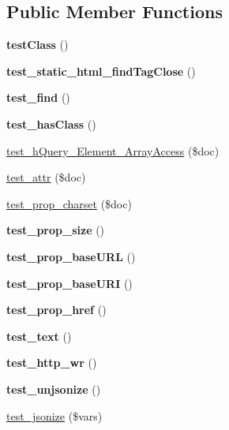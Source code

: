 \subsection*{Public Member Functions}
\begin{DoxyCompactItemize}
\item 
\mbox{\label{classTestHQuery_ab443ea2d5780f2bdef84e52f884a325f}} 
{\bfseries test\+Class} ()
\item 
\mbox{\label{classTestHQuery_ac4b8800d86255709f722f00c8e419f02}} 
{\bfseries test\+\_\+static\+\_\+html\+\_\+find\+Tag\+Close} ()
\item 
\mbox{\label{classTestHQuery_aeeb2c6cd80e096a6d97e9ae42dee8210}} 
{\bfseries test\+\_\+find} ()
\item 
\mbox{\label{classTestHQuery_a59492acce4bbe226ac84759196a10d52}} 
{\bfseries test\+\_\+has\+Class} ()
\item 
\mbox{\hyperlink{classTestHQuery_a54c617e0c89afdbe81d7a8cbb64eb20d}{test\+\_\+h\+Query\+\_\+\+Element\+\_\+\+Array\+Access}} (\$doc)
\item 
\mbox{\hyperlink{classTestHQuery_a88d84974baeb7a51f57df60c1e278013}{test\+\_\+attr}} (\$doc)
\item 
\mbox{\hyperlink{classTestHQuery_a4c9172bbe292403e520fe2b830079dd7}{test\+\_\+prop\+\_\+charset}} (\$doc)
\item 
\mbox{\label{classTestHQuery_ade9f9f37e4ab320cb0ed2afbe90d870b}} 
{\bfseries test\+\_\+prop\+\_\+size} ()
\item 
\mbox{\label{classTestHQuery_a5c8d69b41e037e47c692e366323231ce}} 
{\bfseries test\+\_\+prop\+\_\+base\+U\+RL} ()
\item 
\mbox{\label{classTestHQuery_a901d3b4205127c65a5ab33dbb8e9ae70}} 
{\bfseries test\+\_\+prop\+\_\+base\+U\+RI} ()
\item 
\mbox{\label{classTestHQuery_a2aafb5e338288a6d8d350e6026860c89}} 
{\bfseries test\+\_\+prop\+\_\+href} ()
\item 
\mbox{\label{classTestHQuery_aee50880ab26e3b8135236d27c69880b0}} 
{\bfseries test\+\_\+text} ()
\item 
\mbox{\label{classTestHQuery_aed4e44dada1c4e7a1fd7688d69f4fe6f}} 
{\bfseries test\+\_\+http\+\_\+wr} ()
\item 
\mbox{\label{classTestHQuery_ac7056ad361994200ef4ff1fb7679f2b0}} 
{\bfseries test\+\_\+unjsonize} ()
\item 
\mbox{\hyperlink{classTestHQuery_a0761ef814c63b654b88661198f654038}{test\+\_\+jsonize}} (\$vars)
\end{DoxyCompactItemize}
